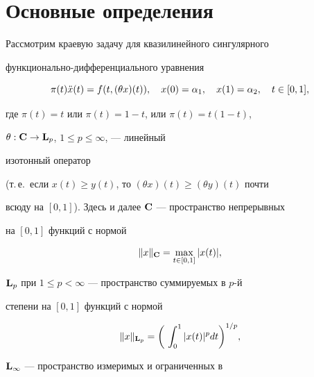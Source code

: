 




\maketitle


\label{begin}





\section{Основные определения}





Рассмотрим краевую задачу для квазилинейного сингулярного


функционально-диф\-фе\-рен\-ци\-аль\-ного уравнения


\begin{equation}


\pi (t)\Ddot{x}(t)=f(t,(\theta x)(t)),\quad


x(0)=\alpha_1,\quad x(1)=\alpha_2, \quad t\in [0,1],


\end{equation}


где $\pi (t)=t$ или $\pi(t)=1-t$, или $\pi(t)=t(1-t)$,


$\theta :\bold C\to \bold L_p$, $1\le p\le\infty$, --- линейный 


изотонный оператор


(т.\,е.~если $x(t)\ge y(t)$, то $(\theta x)(t)\ge(\theta y)(t)$ почти


всюду на $[0,1]$). Здесь и далее $\bold C$ --- пространство непрерывных


на $[0,1]$ функций с нормой


$$


\|x\|_{\bold C}=\max\limits_{t\in[0,1]}|x(t)|,


$$


$\bold L_p$ при $1\le p<\infty$ --- пространство суммируемых в $p$-й


степени на $[0,1]$ функций с нормой


$$


\|x\|_{\bold L_p}=\bigg(\,\int_0^1|x(t)|^pdt\bigg)^{1/p},


$$


$\bold L_\infty$ --- пространство измеримых и ограниченных в


